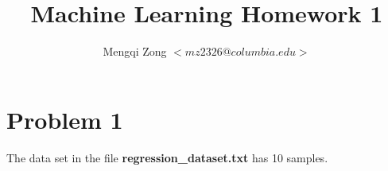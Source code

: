 \documentclass[12pt]{article}
\title{Machine Learning Homework 1}
\author{Mengqi Zong $<mz2326@columbia.edu>$}
\begin{document}
\maketitle

\section{Problem 1}

The data set in the file {\bf regression_dataset.txt} has 10 samples. 
\end{document}
